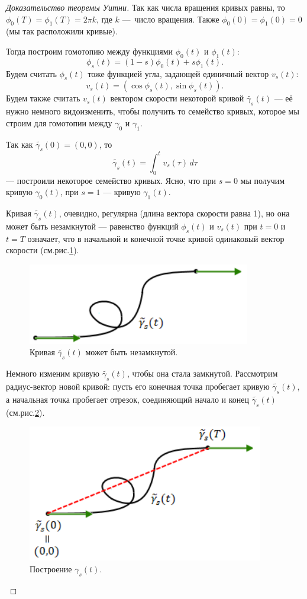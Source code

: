\begin{proof}[Доказательство теоремы Уитни]
    Так как числа вращения кривых равны, то $\phi_0(T) = \phi_1(T) = 2\pi k$, где $k$ — число вращения. Также $\phi_0(0) = \phi_1(0) = 0$ (мы так расположили кривые).

    Тогда построим гомотопию между функциями $\phi_0(t)$ и $\phi_1(t)$:
    \[\phi_s(t) = (1-s) \phi_0(t) + s \phi_1(t).\]
    Будем считать $\phi_s(t)$ тоже функцией угла, задающей единичный вектор $v_s(t)$:
    \[v_s(t) = (\cos{\phi_s(t)}, \sin{\phi_s(t)}).\]
    Будем также считать $v_s(t)$ вектором скорости некоторой кривой $\tilde{\gamma_s}(t)$ — её нужно немного видоизменить, чтобы получить то семейство кривых, которое мы строим для гомотопии между $\gamma_0$ и $\gamma_1$.

    Так как $\tilde{\gamma_s}(0) = (0,0)$, то 
    \[\tilde{\gamma_s}(t) = \int_{0}^{t} v_s(\tau) \, d\tau\]
    — построили некоторое семейство кривых. Ясно, что при $s = 0$ мы получим кривую $\gamma_0(t)$, при $s = 1$ — кривую $\gamma_1(t)$.

    Кривая $\tilde{\gamma_s}(t)$, очевидно, регулярна (длина вектора скорости равна 1), но она может быть незамкнутой — равенство функций $\phi_s(t)$ и $v_s(t)$ при $t=0$ и $t=T$ означает, что в начальной и конечной точке кривой одинаковый вектор скорости (см.рис.\ref{fig:c13.2}).

    \begin{figure}[ht]
        \centering
        \includegraphics[scale=0.7]{images/c13.2.png}
        \caption{Кривая $\tilde{\gamma_s}(t)$ может быть незамкнутой.}
        \label{fig:c13.2}
    \end{figure}

    Немного изменим кривую $\tilde{\gamma_s}(t)$, чтобы она стала замкнутой. Рассмотрим радиус-вектор новой кривой: пусть его конечная точка пробегает кривую $\tilde{\gamma_s}(t)$, а начальная точка пробегает отрезок, соединяющий начало и конец $\tilde{\gamma_s}(t)$ (см.рис.\ref{fig:c13.3}).

    \begin{figure}[ht]
        \centering
        \includegraphics[scale=0.7]{images/c13.3.png}
        \caption{Построение $\gamma_s(t)$.}
        \label{fig:c13.3}
    \end{figure}


\end{proof}
